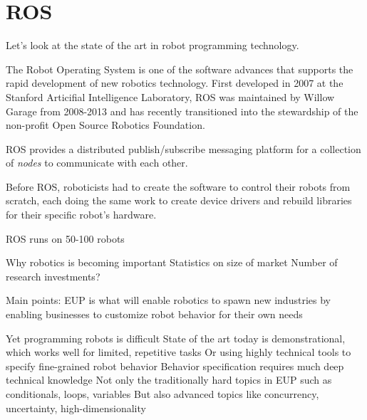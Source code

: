 \documentclass{article}
\begin{document}
\section{ROS}

Let's look at the state of the art in robot programming technology.


The Robot Operating System is one of the software advances that supports the rapid development of new robotics technology.  First developed in 2007 at the Stanford Articifial Intelligence Laboratory, ROS was maintained by Willow Garage from 2008-2013 and has recently transitioned into the stewardship of the non-profit Open Source Robotics Foundation.

ROS provides a distributed publish/subscribe messaging platform for a collection of {\em nodes} to communicate with each other.

Before ROS, roboticists had to create the software to control their robots from scratch, each doing the same work to create device drivers and rebuild libraries for their specific robot's hardware.

ROS runs on 50-100 robots



















Why robotics is becoming important
Statistics on size of market
Number of research investments?

Main points:
	EUP is what will enable robotics to spawn new industries
	by enabling businesses to customize robot behavior for their own needs

	Yet programming robots is difficult
	State of the art today is demonstrational, which works well for limited, repetitive tasks
	Or using highly technical tools to specify fine-grained robot behavior
	Behavior specification requires much deep technical knowledge
	Not only the traditionally hard topics in EUP such as conditionals, loops, variables
	But also advanced topics like concurrency, uncertainty, high-dimensionality
\end{document}
